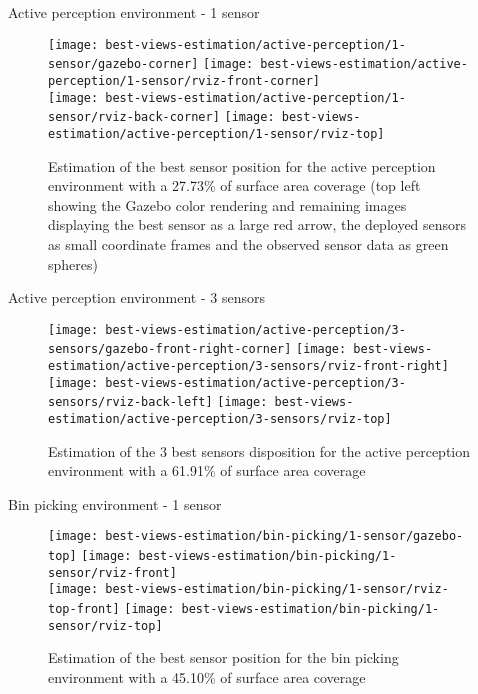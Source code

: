 \begin{frame}{Active perception environment - 1 sensor}
	\begin{figure}
		\centering
		\texttt{[image: best-views-estimation/active-perception/1-sensor/gazebo-corner]}\hspace{4em}
		\texttt{[image: best-views-estimation/active-perception/1-sensor/rviz-front-corner]}\\
		\texttt{[image: best-views-estimation/active-perception/1-sensor/rviz-back-corner]}\hspace{2em}
		\texttt{[image: best-views-estimation/active-perception/1-sensor/rviz-top]}
		\caption{Estimation of the best sensor position for the active perception environment with a 27.73\% of surface area coverage (top left showing the Gazebo color rendering and remaining images displaying the best sensor as a large red arrow, the deployed sensors as small coordinate frames and the observed sensor data as green spheres)}
	\end{figure}
\end{frame}


\begin{frame}{Active perception environment - 3 sensors}
	\begin{figure}
		\centering
		\texttt{[image: best-views-estimation/active-perception/3-sensors/gazebo-front-right-corner]}\hspace{4em}
		\texttt{[image: best-views-estimation/active-perception/3-sensors/rviz-front-right]}\\
		\texttt{[image: best-views-estimation/active-perception/3-sensors/rviz-back-left]}\hspace{2em}
		\texttt{[image: best-views-estimation/active-perception/3-sensors/rviz-top]}
		\caption{Estimation of the 3 best sensors disposition for the active perception environment with a 61.91\% of surface area coverage}
	\end{figure}
\end{frame}


\begin{frame}{Bin picking environment - 1 sensor}
	\begin{figure}
		\centering
		\texttt{[image: best-views-estimation/bin-picking/1-sensor/gazebo-top]}\hspace{2em}
		\texttt{[image: best-views-estimation/bin-picking/1-sensor/rviz-front]}\\
		\texttt{[image: best-views-estimation/bin-picking/1-sensor/rviz-top-front]}\hspace{4em}
		\texttt{[image: best-views-estimation/bin-picking/1-sensor/rviz-top]}
		\caption{Estimation of the best sensor position for the bin picking environment with a 45.10\% of surface area coverage}
	\end{figure}
\end{frame}


